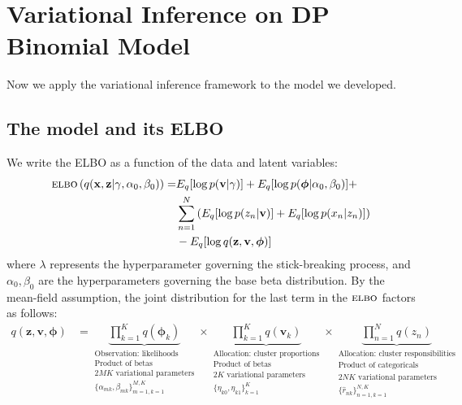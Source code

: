 \documentclass[11pt]{article}
\newcommand{\bx}{\ensuremath{\mathbf{x}}}
\newcommand{\bz}{\ensuremath{\mathbf{z}}}
\newcommand{\ELBO}{\textsc{elbo}}
\begin{document}
\section{Variational Inference on DP Binomial Model}
Now we apply the variational inference framework to the model we developed.

\subsection{The model and its ELBO}

We write the ELBO as a function of the data and latent variables:
\begin{equation}
	\begin{split}
		\ELBO\left(q(\bx, \bz | \gamma, \alpha_0, \beta_0)\right) = &E_q[\log p(\mathbf{v} | \gamma)] + E_q[ \log p(\bm{\phi} | \alpha_0, \beta_0)] + \\ &\sum\limits_{n=1}^N \left( E_q[\log p(z_n | \mathbf{v})] + E_q[\log p(x_n | z_n)]\right) \\  &- E_q[\log q(\bz, \mathbf{v}, \bm{\phi})]
	\end{split}
\end{equation}
where $\lambda$ represents the hyperparameter governing the stick-breaking process, and $\alpha_0, \beta_0$ are the hyperparameters governing the base beta distribution. By the mean-field assumption, the joint distribution for the last term in the $\ELBO$ factors as follows:
\begin{align}
    q(\bz, \mathbf{v}, \bm{\phi}) &=
\underbrace{\prod\limits_{k=1}^K q(\bm{\phi}_k)}_{\substack{\text{Observation: likelihoods}  \\  \text{Product of betas} \\ 2MK \text{ variational parameters} \\  \{\alpha_{mk}, \beta_{mk} \}_{m=1, k=1}^{M, K} }} \times
 \underbrace{\prod\limits_{k=1}^K q(\mathbf{v}_k)}_{\substack{\text{Allocation: cluster proportions} \\ \text{Product of betas} \\ 2K \text{ variational parameters}  \\ \{\eta_{k0}, \eta_{k1}\}_{k=1}^K   }} \times
 \underbrace{\prod\limits_{n=1}^{N} q(z_n)}_{\substack{ \text{Allocation: cluster responsibilities} \\ \text{Product of categoricals} \\ 2NK \text{ variational parameters}  \\ \{\hat{r}_{nk}\}_{n=1, k=1}^{N, K}   }} \nonumber
\end{align}
\end{document}
